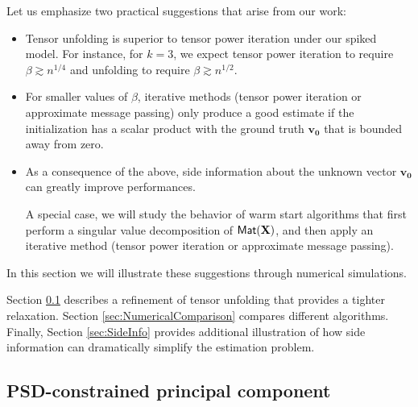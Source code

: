 \documentclass[11pt]{article}
\theoremstyle{definition}
\def\bvz{\mathbf{v_0}}
\def\bX{\mathbf{X}}
\def\M{{\sf Mat}}
\begin{document}
Let us emphasize two practical suggestions that arise from our work:
\begin{itemize}
\item Tensor unfolding is superior to tensor power iteration under 
our spiked model. For instance, for $k=3$, we expect tensor power iteration 
to require $\beta\gtrsim n^{1/4}$ and unfolding to require
$\beta\gtrsim n^{1/2}$.
%
\item For smaller values of $\beta$, iterative methods (tensor power iteration or approximate message
  passing) only produce a good estimate if the initialization has a
  scalar product with the ground truth $\bvz$ that is bounded away
  from zero.
% 
\item  As a consequence of the above,
 side information about the unknown vector $\bvz$ can
  greatly improve performances.

A special case,  we will study the behavior of warm start algorithms that first perform a singular value
  decomposition of $\M(\bX)$, and then apply an iterative method
  (tensor power iteration or approximate message passing).
%
\end{itemize}
%
In this section we will illustrate these suggestions through numerical simulations.

Section \ref{sec:ConeConstrained} describes a refinement of tensor
unfolding that provides a tighter relaxation. Section
\ref{sec:NumericalComparison} compares different algorithms. Finally,
Section \ref{sec:SideInfo} provides additional illustration of how
side information can dramatically simplify the estimation problem.

\subsection{PSD-constrained principal component}
\label{sec:ConeConstrained}
\end{document}
